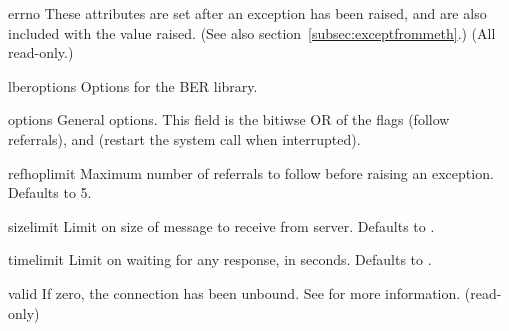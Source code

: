 
\begin{memberdesc}[LDAP]{errno} %
    These attributes are set after an exception has been raised, and
    are also included with the value raised. 
    (See also section~\ref{subsec:exceptfrommeth}.)
    (All read-only.)
\end{memberdesc}


\begin{memberdesc}[LDAP]{lberoptions} %
    Options for the BER library.
\end{memberdesc}


\begin{memberdesc}[LDAP]{options} %
    General options. This field is the bitiwse OR of the flags
	 (follow referrals), and
	   (restart the  system call
			      when interrupted).
\end{memberdesc}


\begin{memberdesc}[LDAP]{refhoplimit} %
    Maximum number of referrals to follow before raising an exception.
    Defaults to 5.
\end{memberdesc}


\begin{memberdesc}[LDAP]{sizelimit} %
    Limit on size of message to receive from server. 
    Defaults to .
\end{memberdesc}


\begin{memberdesc}[LDAP]{timelimit} %
    Limit on waiting for any response, in seconds. 
    Defaults to .
\end{memberdesc}


\begin{memberdesc}[LDAP]{valid} %
    If zero, the connection has been unbound. See  for
    more information.
    (read-only)
\end{memberdesc}
